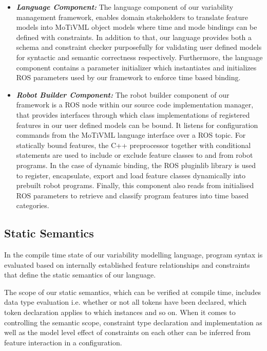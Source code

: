 \documentclass[conference]{IEEEtran}
\begin{document}
\begin{itemize}
	\item \textit{\textbf{Language Component:}}
	The language component of our variability management framework, enables domain stakeholders to translate feature models into MoTiVML object models where time and mode bindings can be defined with constraints. In addition to that, our language provides both a schema and constraint checker purposefully for validating user defined models for syntactic and semantic correctness respectively. Furthermore, the language component contains a parameter initializer which instantiates and initializes ROS parameters used by our framework to enforce time based binding.
	\item \textit{\textbf{Robot Builder Component:}}
	The robot builder component of our framework is a ROS node within our source code implementation manager, that provides interfaces through which class implementations of registered features in our user defined models can be bound. It listens for configuration commands from the MoTiVML language interface over a ROS topic. For statically bound features, the C++ preprocessor together with conditional statements are used to include or exclude feature classes to and from robot programs.  In the case of dynamic binding, the ROS pluginlib library is used to register, encapsulate, export and load feature classes dynamically into prebuilt robot programs. Finally, this component also reads from initialised ROS parameters to retrieve and classify program features into time based categories. 
\end{itemize}


\subsection{Static Semantics}
In the compile time state of our variability modelling language, program syntax is evaluated based on internally established feature relationships and constraints that define the static semantics of our language.

The scope of our static semantics, which can be verified  at compile time, includes data type evaluation i.e. whether or not all tokens have been declared, which token declaration applies to which instances and so on. When it comes to controlling the semantic scope, constraint type declaration and implementation as well as the model level effect of constraints on each other can be inferred from feature interaction in a configuration.
\end{document}
